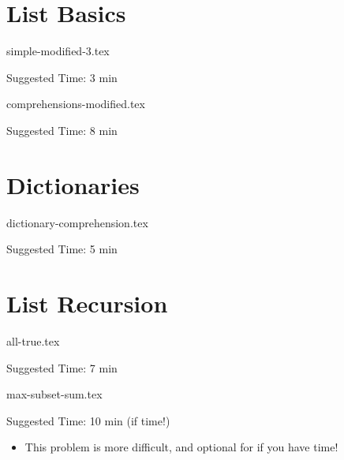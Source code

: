 \documentclass{exam}
\begin{document}
\section{List Basics}
\begin{questions}
    {simple-modified-3.tex}
    \begin{questionmeta}
        Suggested Time: 3 min
    \end{questionmeta}

    {comprehensions-modified.tex}
    \begin{questionmeta}
        Suggested Time: 8 min
    \end{questionmeta}
\end{questions}


\section{Dictionaries}

\begin{questions}
{dictionary-comprehension.tex}
    \begin{questionmeta}
        Suggested Time: 5 min
    \end{questionmeta}
\end{questions}

\section{List Recursion}

\begin{questions}

    {all-true.tex}
    \begin{questionmeta}
        Suggested Time: 7 min
    \end{questionmeta}

    {max-subset-sum.tex}
    \begin{questionmeta}
        Suggested Time: 10 min (if time!)
        \begin{itemize}
            \item This problem is more difficult, and optional for if you have time!
        \end{itemize}
    \end{questionmeta}


\end{questions}
\end{document}
